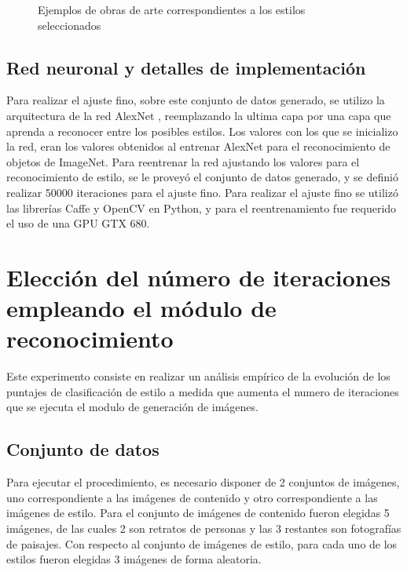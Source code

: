 \documentclass[a4paper,11pt,spanish]{book}
\begin{document}
\begin{figure}
\begin{center}
\begin{tabularx}{\textwidth}{@{}cXX@{}}
	  \end{tabularx}

	  \caption{Ejemplos de obras de arte correspondientes a los estilos seleccionados}\label{mosaico_estilos}
	  \end{center}

	\end{figure}

    \subsection{Red neuronal y detalles de implementación}
      Para realizar el ajuste fino, sobre este conjunto de datos generado, se utilizo la arquitectura de la red AlexNet \cite{AlexNet}, 
      reemplazando la ultima capa por una capa que aprenda a reconocer entre los posibles estilos. 
      Los valores con los que se inicializo la red, eran los valores obtenidos al entrenar AlexNet para el reconocimiento de objetos de ImageNet.
      Para reentrenar la red ajustando los valores para el reconocimiento de estilo, se le proveyó el conjunto de datos generado, y se definió realizar 50000 iteraciones para el ajuste fino.
      Para realizar el ajuste fino se utilizó las librerías Caffe y OpenCV en Python, y para el reentrenamiento fue requerido el uso de una GPU GTX 680.

  \section{Elección del número de iteraciones empleando el módulo de reconocimiento}
    Este experimento consiste en realizar un análisis empírico de la evolución de los puntajes de clasificación de estilo a medida que aumenta el numero de iteraciones
    que se ejecuta el modulo de generación de imágenes.
    \subsection{Conjunto de datos}
      Para ejecutar el procedimiento, es necesario disponer de 2 conjuntos de imágenes, uno correspondiente a las imágenes de contenido y otro correspondiente a las imágenes de estilo.
      Para el conjunto de imágenes de contenido fueron elegidas 5 imágenes, de las cuales 2 son retratos de personas y las 3 restantes son fotografías de paisajes.
      Con respecto al conjunto de imágenes de estilo, para cada uno de los estilos fueron elegidas 3 imágenes de forma aleatoria.
\end{document}
